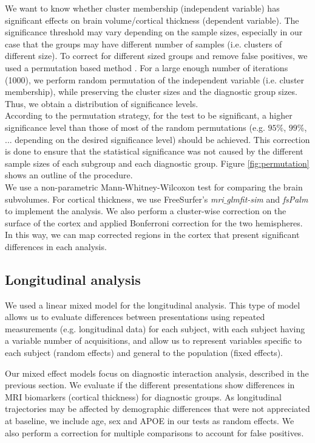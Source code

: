We want to know whether cluster membership (independent variable) has significant effects on brain volume/cortical thickness (dependent variable). The significance threshold may vary depending on the sample sizes, especially in our case that the groups may have different number of samples (i.e. clusters of different size). To correct for different sized groups and remove false positives, we used a permutation based method \cite{Good2000}. For a large enough number of iterations (1000), we perform random permutation of the independent variable (i.e. cluster membership), while preserving the cluster sizes and the diagnostic group sizes. Thus, we obtain a distribution of significance levels. \\

According to the permutation strategy, for the test to be significant, a higher significance level than those of most of the random permutations (e.g. $95\%$, $99\%$, ... depending on the desired significance level) should be achieved. This correction is done to ensure that the statistical significance was not caused by the different sample sizes of each subgroup and each diagnostic group. Figure \ref{fig:permutation} shows an outline of the procedure. \\

We use a non-parametric Mann-Whitney-Wilcoxon test for comparing the brain subvolumes. For cortical thickness, we use FreeSurfer's \textit{mri$\_$glmfit-sim} and \textit{fsPalm} to implement the analysis. We also perform a cluster-wise correction on the surface of the cortex and applied Bonferroni correction for the two hemispheres. In this way, we can map corrected regions in the cortex that present significant differences in each analysis. \\

\subsection{Longitudinal analysis}
We used a linear mixed model for the longitudinal analysis. This type of model allows us to evaluate differences between presentations using repeated measurements (e.g. longitudinal data) for each subject, with each subject having a variable number of acquisitions, and allow us to represent variables specific to each subject (random effects) and general to the population (fixed effects).

Our mixed effect models focus on diagnostic interaction analysis, described in the previous section. We evaluate if the different presentations show differences in MRI biomarkers (cortical thickness) for diagnostic groups. As longitudinal trajectories may be affected by demographic differences that were not appreciated at baseline, we include age, sex and APOE in our tests as random effects. We also perform a correction for multiple comparisons to account for false positives.

